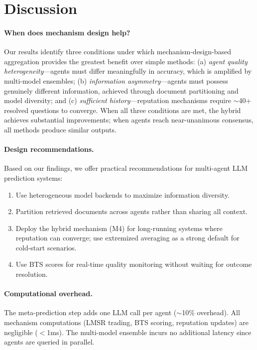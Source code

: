 \documentclass[conference]{IEEEtran}
\begin{document}
\section{Discussion}
\label{sec:discussion}

\paragraph{When does mechanism design help?}
Our results identify three conditions under which mechanism-design-based aggregation provides the greatest benefit over simple methods: (a) \textit{agent quality heterogeneity}---agents must differ meaningfully in accuracy, which is amplified by multi-model ensembles; (b) \textit{information asymmetry}---agents must possess genuinely different information, achieved through document partitioning and model diversity; and (c) \textit{sufficient history}---reputation mechanisms require $\sim$40+ resolved questions to converge. When all three conditions are met, the hybrid achieves substantial improvements; when agents reach near-unanimous consensus, all methods produce similar outputs.

\paragraph{Design recommendations.}
Based on our findings, we offer practical recommendations for multi-agent LLM prediction systems:
\begin{enumerate}
    \item Use heterogeneous model backends to maximize information diversity.
    \item Partition retrieved documents across agents rather than sharing all context.
    \item Deploy the hybrid mechanism (M4) for long-running systems where reputation can converge; use extremized averaging as a strong default for cold-start scenarios.
    \item Use BTS scores for real-time quality monitoring without waiting for outcome resolution.
\end{enumerate}

\paragraph{Computational overhead.}
The meta-prediction step adds one LLM call per agent ($\sim$10\% overhead). All mechanism computations (LMSR trading, BTS scoring, reputation updates) are negligible ($<$1ms). The multi-model ensemble incurs no additional latency since agents are queried in parallel.
\end{document}

